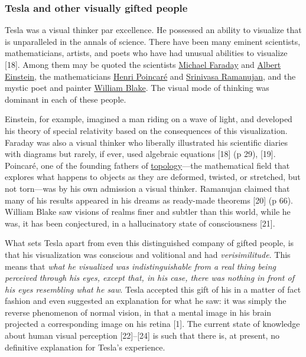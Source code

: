 \documentclass[
  12pt,
  british,
  a4paper,
]{article}
\begin{document}
\hypertarget{tesla-and-other-visually-gifted-people}{%
\subsubsection{Tesla and other visually gifted
people}\label{tesla-and-other-visually-gifted-people}}

Tesla was a visual thinker par excellence. He possessed an ability to
visualize that is unparalleled in the annals of science. There have been
many eminent scientists, mathematicians, artists, and poets who have had
unusual abilities to visualize {[}18{]}. Among them may be quoted the
scientists \href{https://en.wikipedia.org/wiki/Michael_Faraday}{Michael
Faraday} and \href{https://en.wikipedia.org/wiki/Albert_Einstein}{Albert
Einstein}, the mathematicians
\href{https://en.wikipedia.org/wiki/Henri_Poincar\%C3\%A9}{Henri
Poincaré} and
\href{https://en.wikipedia.org/wiki/Srinivasa_Ramanujan}{Srinivasa
Ramanujan}, and the mystic poet and painter
\href{https://en.wikipedia.org/wiki/William_Blake}{William Blake}. The
visual mode of thinking was dominant in each of these people.

Einstein, for example, imagined a man riding on a wave of light, and
developed his theory of special relativity based on the consequences of
this visualization. Faraday was also a visual thinker who liberally
illustrated his scientific diaries with diagrams but rarely, if ever,
used algebraic equations {[}18{]} (p 29), {[}19{]}. Poincaré, one of the
founding fathers of
\href{https://mathworld.wolfram.com/Topology.html}{topology}---the
mathematical field that explores what happens to objects as they are
deformed, twisted, or stretched, but not torn---was by his own admission
a visual thinker. Ramanujan claimed that many of his results appeared in
his dreams as ready-made theorems {[}20{]} (p 66). William Blake saw
visions of realms finer and subtler than this world, while he was, it
has been conjectured, in a hallucinatory state of consciousness
{[}21{]}.

What sets Tesla apart from even this distinguished company of gifted
people, is that his visualization was conscious and volitional and had
\emph{verisimilitude}. This means that \emph{what he visualized was
indistinguishable from a real thing being perceived through his eyes,
except that, in his case, there was nothing in front of his eyes
resembling what he saw}. Tesla accepted this gift of his in a matter of
fact fashion and even suggested an explanation for what he saw: it was
simply the reverse phenomenon of normal vision, in that a mental image
in his brain projected a corresponding image on his retina {[}1{]}. The
current state of knowledge about human visual perception
{[}22{]}--{[}24{]} is such that there is, at present, no definitive
explanation for Tesla's experience.
\end{document}
